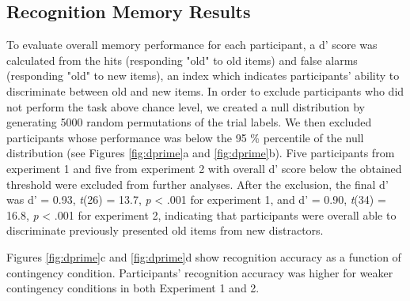 \documentclass[a4paper,12pt]{article}
\begin{document}
\subsection{Recognition Memory Results}
To evaluate overall memory performance for each participant, a d' score was calculated from the hits (responding "old" to old items) and false alarms (responding "old" to new items), an index which indicates participants' ability to discriminate between old and new items. In order to exclude participants who did not perform the task above chance level, we created a null distribution by generating 5000 random permutations of the trial labels. We then excluded participants whose performance was below the 95 \% percentile of the null distribution (see Figures \ref{fig:dprime}a and \ref{fig:dprime}b). Five participants from experiment 1 and five from experiment 2 with overall d' score below the obtained threshold were excluded from further analyses. After the exclusion, the final d' was d' = 0.93,  \textit{t}(26) = 13.7, \textit{p} < .001 for experiment 1, and d’ = 0.90,  \textit{t}(34) = 16.8, \textit{p} < .001 for experiment 2, indicating that participants were overall able to discriminate previously presented old items from new distractors. \par
Figures \ref{fig:dprime}c and \ref{fig:dprime}d show recognition accuracy as a function of contingency condition. Participants' recognition accuracy was higher for weaker contingency conditions in both Experiment 1 and 2. 


\end{document}

